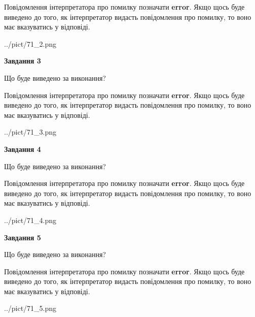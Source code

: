 \documentclass[12pt, ukrainian]{article}
\begin{document}
{\begin {large}
Повідомлення інтерпретатора про помилку позначати \textbf{error}.
Якщо щось буде виведено до того, як інтерпретатор видасть повідомлення про помилку, 
то воно має вказуватись у відповіді. \par


\begin{center}
	{../pict/71_2.png}
\end{center}
\newpage

{\begin {center}\textbf{Завдання 3}\end {center}}\par
Що буде виведено за виконання?

Повідомлення інтерпретатора про помилку позначати \textbf{error}.
Якщо щось буде виведено до того, як інтерпретатор видасть повідомлення про помилку, 
то воно має вказуватись у відповіді. \par


\begin{center}
	{../pict/71_3.png}
\end{center}
\newpage

{\begin {center}\textbf{Завдання 4}\end {center}}\par
Що буде виведено за виконання?

Повідомлення інтерпретатора про помилку позначати \textbf{error}.
Якщо щось буде виведено до того, як інтерпретатор видасть повідомлення про помилку, 
то воно має вказуватись у відповіді. \par


\begin{center}
	{../pict/71_4.png}
\end{center}
\newpage

{\begin {center}\textbf{Завдання 5}\end {center}}\par
Що буде виведено за виконання?

Повідомлення інтерпретатора про помилку позначати \textbf{error}.
Якщо щось буде виведено до того, як інтерпретатор видасть повідомлення про помилку, 
то воно має вказуватись у відповіді. \par


\begin{center}
	{../pict/71_5.png}
\end{center}
\newpage


\end{large}}
\end{document}
